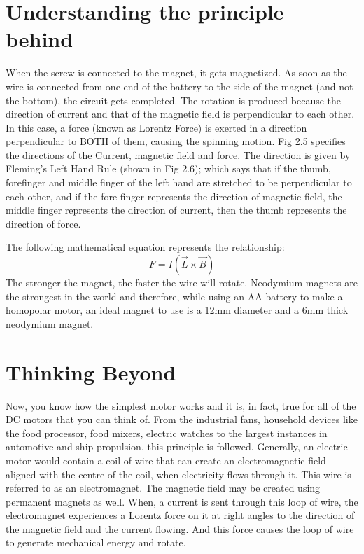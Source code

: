 \section{Understanding the principle behind}
When the screw is connected to the magnet, it gets magnetized. As soon as the wire is connected from one end of the 
battery to the side of the magnet (and not the bottom), the circuit gets completed. The rotation is produced because 
the direction of current and that of the magnetic field is perpendicular to each other. In this case, a force (known 
as Lorentz Force) is exerted in a direction perpendicular to BOTH of them, causing the spinning motion. Fig 2.5 specifies 
the directions of the Current, magnetic field and force. The direction is given by Fleming’s Left Hand Rule (shown in 
Fig 2.6); which says that if the thumb, forefinger and middle finger of the left hand are stretched to be perpendicular 
to each other, and if the fore finger represents the direction of magnetic field, the middle finger represents the 
direction of current, then the thumb represents the direction of force.

The following mathematical equation represents the relationship:
\begin{equation*}
    F = I(\overrightarrow{L} \times \overrightarrow{B})
\end{equation*}
The stronger the magnet, the faster the wire will rotate. Neodymium magnets are the strongest in the world and therefore, 
while using an AA battery to make a homopolar motor, an ideal magnet to use is a 12mm diameter and a 6mm thick neodymium magnet.

\section{Thinking Beyond}
Now, you know how the simplest motor works and it is, in fact, true for all of the DC motors that you can think of. From 
the industrial fans, household devices like the food processor, food mixers, electric watches to the largest instances in 
automotive and ship propulsion, this principle is followed. Generally, an electric motor would contain a coil of wire that 
can create an electromagnetic field aligned with the centre of the coil, when electricity flows through it. This wire is 
referred to as an electromagnet. The magnetic field may be created using permanent magnets as well. When, a current is sent 
through this loop of wire, the electromagnet experiences a Lorentz force on it at right angles to the direction of the 
magnetic field and the current flowing. And this force causes the loop of wire to generate mechanical energy and rotate.

